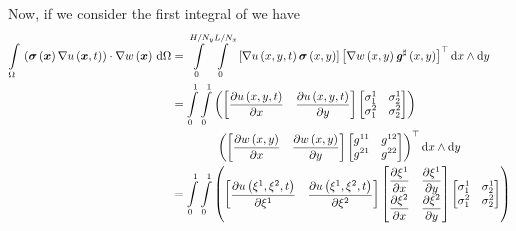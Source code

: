 Now, if we consider the first integral of  we have
\begin{equation}
  \begin{aligned}
    \gint{\Omega}{}{\dotprod{\pbrac{\fnof{\conductivitytensor}{\vectr{x}}\gradient{}{\fnof{u}{\vectr{x},t}}}}
      {\gradient{}{\fnof{w}{\vectr{x}}}}}{\Omega}
    &=\giint{0}{H/N_{y}}{0}{L/N_{x}}{\sqbrac{\gradient{}{\fnof{u}{x,y,t}}\fnof{\conductivitytensor}{x,y}}
    \transpose{\sqbrac{\gradient{}{\fnof{w}{x,y}}\fnof{\sharptensor{\generalmetrictensor}}{x,y}}}}{x}{y}\\
    &=\dintl{0}{1}\dintl{0}{1}\pbrac{\begin{bmatrix}
          \delby{\fnof{u}{x,y,t}}{x}&\delby{\fnof{u}{x,y,t}}{y}
        \end{bmatrix}\begin{bmatrix}
          \conductivitytensorsymbol^{1}_{1} & \conductivitytensorsymbol^{1}_{2} \\
          \conductivitytensorsymbol^{2}_{1} & \conductivitytensorsymbol^{2}_{2}
    \end{bmatrix}}\\
    &\qquad\qquad\transpose{\pbrac{\begin{bmatrix}
            \delby{\fnof{w}{x,y}}{x}&\delby{\fnof{w}{x,y}}{y}
          \end{bmatrix}\begin{bmatrix}
            \generalmetrictensorsymbol^{11} & \generalmetrictensorsymbol^{12} \\
            \generalmetrictensorsymbol^{21} & \generalmetrictensorsymbol^{22}
    \end{bmatrix}}}\,\exteriorderivop x \wedge\exteriorderivop y \\
    &=\dintl{0}{1}\dintl{0}{1}\pbrac{\begin{bmatrix}
        \delby{\fnof{u}{\xione,\xitwo,t}}{\xione}&\delby{\fnof{u}{\xione,\xitwo,t}}{\xitwo}
      \end{bmatrix}\begin{bmatrix}
      \delby{\xione}{x} & \delby{\xione}{y} \\
      \delby{\xitwo}{x} & \delby{\xitwo}{y}
    \end{bmatrix}\begin{bmatrix}
        \conductivitytensorsymbol^{1}_{1} & \conductivitytensorsymbol^{1}_{2} \\
        \conductivitytensorsymbol^{2}_{1} & \conductivitytensorsymbol^{2}_{2}
    \end{bmatrix}} \\

\end{aligned}
\end{equation}
